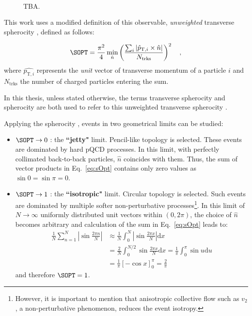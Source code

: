 \begin{figure}%
\\
\caption{TBA.}
\label{fig:sphero:nmpinjets}
\end{figure}

This work uses a modified definition of this observable, \textit{unweighted} transverse spherocity \SOPT, defined as follows:

\begin{align}
\SOPT = \frac{\pi^2}{4} \min_{\hat{n}} \left(\frac{\sum_i
      |\hat{p}_{\textrm{T},i} \times \hat{n}|}{N_{\textrm{trks}}}  \right)^2 \quad ,
\label{eq:sOpt}      
\end{align}
where $\hat{p_{\textrm{T},i}}$ represents the \textit{unit} vector of transverse momentum of a particle $i$ and $N_{\textrm{trks}}$ the number of charged particles entering the sum. 

In this thesis, unless stated otherwise, the terms transverse spherocity and spherocity are both used to refer to this unweighted transverse spherocity \SOPT.

Applying the spherocity \SOPT, events in two geometrical limits can be studied:
\begin{itemize}
\item $\SOPT \rightarrow 0$ : the \textbf{``jetty"} limit. Pencil-like topology is selected. These events are dominated by hard pQCD processes. In this limit, with perfectly collimated back-to-back particles, $\hat{n}$ coincides with them. Thus, the sum of vector products in Eq.~\ref{eq:sOpt} contains only zero values as $\sin 0 = \sin \pi = 0$.
\item $\SOPT \rightarrow 1$ : the \textbf{``isotropic"} limit. Circular topology is selected. Such events are dominated by multiple softer non-perturbative processes\footnote{However, it is important to mention that  anisotropic collective flow such as $v_2$, a non-perturbative phenomenon, reduces the event isotropy.}. In this limit of $N\rightarrow\infty$ uniformly distributed unit vectors within $(0,2\pi)$, the choice of $\hat{n}$ becomes arbitrary and calculation of the sum in Eq.~\ref{eq:sOpt} leads to:
 \begin{align}
\frac{1}{N} \sum_{n=1}^N | \sin\frac{2\pi n}{N}| &\approx \frac{1}{N} \int_0^N |\sin\frac{2\pi x}{N}| \mathrm{d}x \\ 
&= \frac{2}{N} \int_0^{N/2} \sin\frac{2\pi x}{N} \mathrm{d}x = \frac{1}{\pi} \int_0^{\pi} \sin u \mathrm{d}u \\
&= \frac{1}{\pi} \left[-\cos x\right]_0^{\pi} = \frac{2}{\pi} \quad \,
\end{align}
and therefore $\SOPT=1$. 
\end{itemize}

